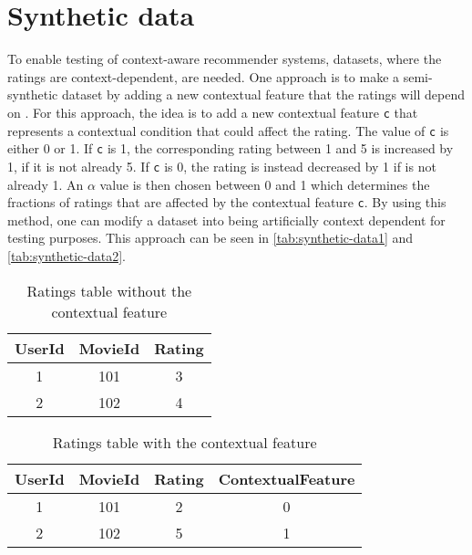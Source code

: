 \section{Synthetic data}
To enable testing of context-aware recommender systems, datasets, where the ratings are context-dependent, are needed.
One approach is to make a semi-synthetic dataset by adding a new contextual feature that the ratings will depend on \cite{baltrunasContextItemSplit}.
For this approach, the idea is to add a new contextual feature \texttt{c} that represents a contextual condition that could affect the rating.
The value of \texttt{c} is either 0 or 1. 
If \texttt{c} is 1, the corresponding rating between 1 and 5 is increased by 1, if it is not already 5.
If \texttt{c} is 0, the rating is instead decreased by 1 if is not already 1.
An $\alpha$ value is then chosen between 0 and 1 which determines the fractions of ratings that are affected by the contextual feature \texttt{c}.
By using this method, one can modify a dataset into being artificially context dependent for testing purposes.
This approach can be seen in \autoref{tab:synthetic-data1} and \autoref{tab:synthetic-data2}.
\begin{table}[hbt!]
    \centering
    \begin{tabular}{|c|c|c|}
    \hline
    UserId & MovieId & Rating \\ [0.5ex] 
    \hline\hline
    1 & 101 & 3 \\
    \hline
    2 & 102 & 4 \\
    \hline
    \end{tabular}
    \caption{Ratings table without the contextual feature}
    \label{tab:synthetic-data1}
\end{table}
\begin{table}[hbt!]
    \centering
    \begin{tabular}{|c|c|c|c|} 
    \hline
    UserId & MovieId & Rating & ContextualFeature \\ [0.5ex] 
    \hline\hline
    1 & 101 & 2 & 0 \\
    \hline
    2 & 102 & 5 & 1 \\
    \hline
    \end{tabular}
    \caption{Ratings table with the contextual feature}
    \label{tab:synthetic-data2}
\end{table}